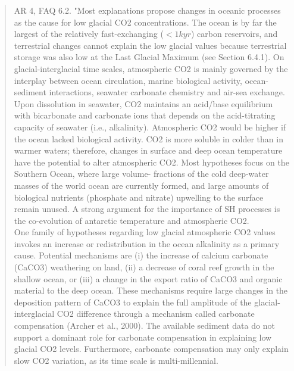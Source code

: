 \begin{quotation}
	AR 4, FAQ 6.2.  "Most explanations propose changes in oceanic processes as the cause for low glacial CO2 concentrations. The ocean is by far the largest of the relatively fast-exchanging ($< 1 kyr$) carbon reservoirs, and terrestrial changes cannot explain the low glacial values because terrestrial storage was also low at the Last Glacial Maximum (see Section 6.4.1). On glacial-interglacial time scales, atmospheric CO2 is mainly governed by the interplay between ocean circulation, marine biological activity, ocean-sediment interactions, seawater carbonate chemistry and air-sea exchange. Upon dissolution in seawater, CO2 maintains an acid/base equilibrium with bicarbonate and carbonate ions that depends on the acid-titrating capacity of seawater (i.e., alkalinity). Atmospheric CO2 would be higher if the ocean lacked biological activity. CO2 is more soluble in colder than in warmer waters; therefore, changes in surface and deep ocean temperature have the potential to alter atmospheric CO2. Most hypotheses focus on the Southern Ocean, where large volume- fractions of the cold deep-water masses of the world ocean are currently formed, and large amounts of biological nutrients (phosphate and nitrate) upwelling to the surface remain unused. A strong argument for the importance of SH processes is the co-evolution of antarctic temperature and atmospheric CO2.\\
	One family of hypotheses regarding low glacial atmospheric CO2 values invokes an increase or redistribution in the ocean alkalinity as a primary cause. Potential mechanisms are (i) the increase of calcium carbonate (CaCO3) weathering on land, (ii) a decrease of coral reef growth in the shallow ocean, or (iii) a change in the export ratio of CaCO3 and organic material to the deep ocean. These mechanisms require large changes in the deposition pattern of CaCO3 to explain the full amplitude of the glacial-interglacial CO2 difference through a mechanism called carbonate compensation (Archer et al., 2000). The available sediment data do not support a dominant role for carbonate compensation in explaining low glacial CO2 levels. Furthermore, carbonate compensation may only explain slow CO2 variation, as its time scale is multi-millennial.\\

\end{quotation}
